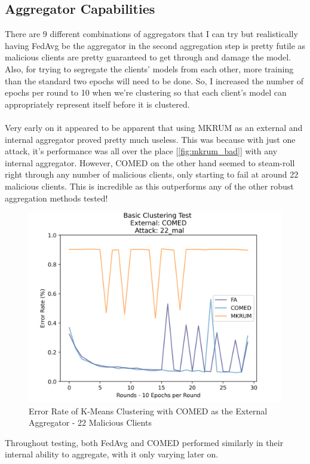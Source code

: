 \subsection{Aggregator Capabilities}
There are 9 different combinations of aggregators that I can try but realistically having FedAvg be the aggregator in the second aggregation step is pretty futile as malicious clients are pretty guaranteed to get through and damage the model.
Also, for trying to segregate the clients' models from each other, more training than the standard two epochs will need to be done.
So, I increased the number of epochs per round to 10 when we're clustering so that each client's model can appropriately represent itself before it is clustered.
\\ \\
Very early on it appeared to be apparent that using MKRUM as an external and internal aggregator proved pretty much useless.
This was because with just one attack, it's performance was all over the place [\ref{fig:mkrum_bad}] with any internal aggregator.
However, COMED on the other hand seemed to steam-roll right through any number of malicious clients, only starting to fail at around 22 malicious clients.
This is incredible as this outperforms any of the other robust aggregation methods tested!
\begin{figure}[htbp]
	\centering
    \includegraphics[scale=0.5]{my_agg/graphs/cluster_comed_22.png}
	\caption{Error Rate of K-Means Clustering with COMED as the External Aggregator - 22 Malicious Clients}
	\label{fig:comed_22}
\end{figure}
Throughout testing, both FedAvg and COMED performed similarly in their internal ability to aggregate, with it only varying later on.
